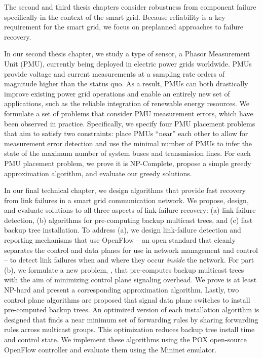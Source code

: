 The second and third thesis chapters consider robustness from component failure specifically in the context of the smart grid. Because reliability is a key requirement for the smart grid, we focus on 
preplanned approaches to failure recovery.

In our second thesis chapter, we study a type of sensor, a Phasor Measurement Unit (PMU), currently being deployed in electric power grids worldwide. 
PMUs provide voltage and current measurements at a sampling rate orders of magnitude higher than the status quo.  As a result, PMUs can 
both drastically improve existing power grid operations and enable an entirely new set of applications, such as the reliable integration of renewable energy resources. 
We formulate a set of problems that consider PMU measurement errors, which have been observed in practice.  Specifically, we specify four PMU placement problems
that aim to satisfy two constraints: place PMUs ``near'' each other to allow for measurement error detection and use the minimal number of PMUs to infer the state of the maximum number of system buses and transmission lines. 
For each PMU placement problem, we prove it is NP-Complete, propose a simple greedy approximation algorithm, and evaluate our greedy solutions.

In our final technical chapter, we design algorithms that provide fast recovery from link failures in a smart grid communication network. 
We propose, design, and evaluate solutions to all three aspects of link failure recovery: (a) link failure detection, (b) algorithms for pre-computing backup multicast trees, and
(c) fast backup tree installation. 
To address (a), we design link-failure detection and reporting mechanisms that use OpenFlow -- an open standard that cleanly separates the control and data planes for use 
in network management and control -- to detect link failures when and where they occur \emph{inside} the network.
For part (b), we formulate a new problem, \mcs, that pre-computes backup multicast trees with the aim of minimizing control plane signaling overhead. We prove \mc 
is at least NP-hard and present a corresponding approximation algorithm.
Lastly, two control plane algorithms are proposed that signal data plane switches to install pre-computed backup trees. 
An optimized version of each installation algorithm is designed that finds a near minimum set of forwarding rules 
by sharing forwarding rules across multicast groups. This optimization
reduces backup tree install time and control state.  
We implement these algorithms using the POX open-source OpenFlow controller and evaluate them using the Mininet emulator. 






